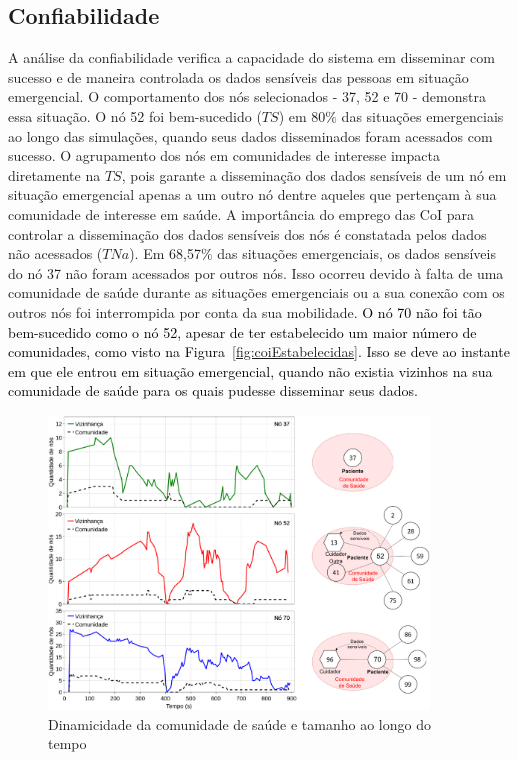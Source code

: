 \documentclass[12pt]{article}
\newcommand{\rev}[1]{\textcolor{black}{{#1}}}
\begin{document}
\subsection{Confiabilidade}

A análise da confiabilidade verifica a capacidade do sistema em disseminar com sucesso e de maneira controlada os dados sensíveis das pessoas em situação emergencial. O comportamento dos nós selecionados - 37, 52 e 70 - demonstra essa situação. O nó 52 foi bem-sucedido ($TS$) em 80\% das situações emergenciais ao longo das simulações, quando seus dados disseminados foram acessados com sucesso. O agrupamento dos nós em comunidades de interesse impacta diretamente na $TS$, pois garante a disseminação dos dados sensíveis de um nó em situação emergencial apenas a um outro nó dentre aqueles que pertençam à sua comunidade de interesse em saúde. A importância do emprego das CoI para controlar a disseminação dos dados sensíveis dos nós é constatada pelos dados não acessados ($TNa$). Em 68,57\% das situações emergenciais, os dados sensíveis do nó 37 não foram acessados por outros nós. Isso ocorreu devido à falta de uma comunidade de saúde durante as situações emergenciais ou a sua conexão com os outros nós foi interrompida por conta da sua mobilidade. \rev{O nó 70 não foi tão bem-sucedido como o nó 52, apesar de ter estabelecido um maior número de comunidades, como 
visto na Figura~\ref{fig:coiEstabelecidas}. Isso 
se deve ao 
instante em que ele entrou em situação emergencial, quando não %
existia vizinhos na sua comunidade de saúde para os quais pudesse disseminar seus dados.} 

\begin{figure}[!htb]
\centering
\includegraphics[width=0.9\textwidth]{figures/neighs_cois_v2_890s_stack_3.pdf}
\vspace{-0.2cm}
\caption{Dinamicidade da comunidade de saúde e tamanho ao longo do tempo}
\label{fig:neighs_x_cois}
\end{figure}
\end{document}
